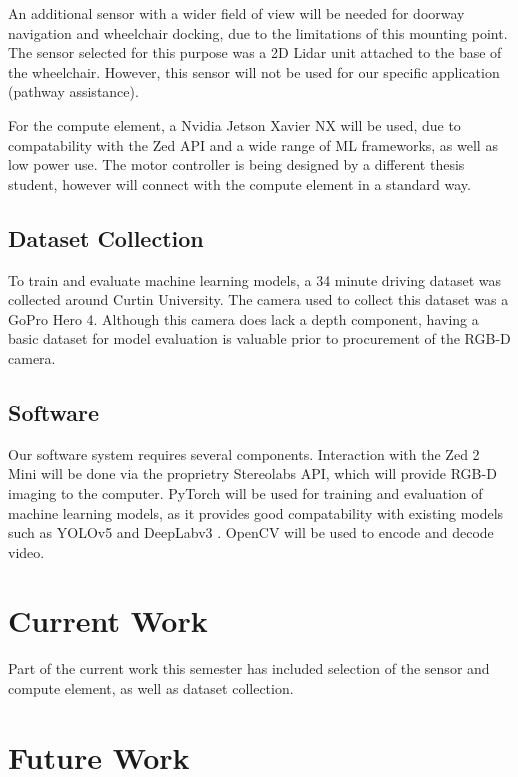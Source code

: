 \documentclass[12pt]{article}
\begin{document}
An additional sensor with a wider field of view will be needed for doorway navigation
and wheelchair docking, due to the limitations of this mounting point. The sensor selected for this purpose
was a 2D Lidar unit attached to the base of the wheelchair. However, this sensor will not be used for
our specific application (pathway assistance).

For the compute element, a Nvidia Jetson Xavier NX will be used, due to compatability with the Zed API
and a wide range of ML frameworks, as well as low power use.
The motor controller is being designed by a different thesis student, however will connect with the compute element in a standard way.

\subsection{Dataset Collection}
To train and evaluate machine learning models, a 34 minute driving dataset was collected around Curtin University.
The camera used to collect this dataset was a GoPro Hero 4. Although this camera does lack a depth component,
having a basic dataset for model evaluation is valuable prior to procurement of the RGB-D camera.

\subsection{Software}
Our software system requires several components. Interaction with the Zed 2 Mini will be done
via the proprietry Stereolabs API, which will provide RGB-D imaging to the computer.
PyTorch \cite{paszkePyTorchImperativeStyle2019} will be used for training and evaluation of machine learning models, as it
provides good compatability with existing models such as YOLOv5 \cite{ultralyticsYOLOv5}
and DeepLabv3 \cite{chenRethinkingAtrousConvolution2017}. OpenCV \cite{bradskiOpenCVLibrary2000} will be used to encode and decode video.
\pagebreak





\section{Current Work}
Part of the current work this semester has included selection of the sensor and compute element, as well as dataset collection.

\pagebreak





\section{Future Work}

\pagebreak





\printbibliography[heading=bibnumbered]
\end{document}
